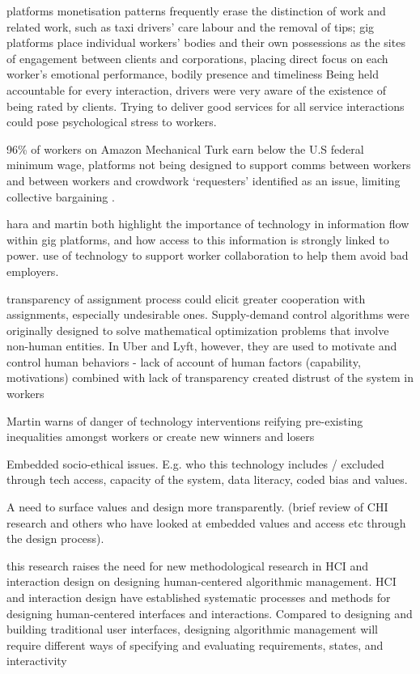 platforms monetisation patterns frequently erase the distinction of work and related work, such as taxi drivers' care labour and the removal of tips; gig platforms place individual workers' bodies and their own possessions as  the sites of engagement between clients and corporations, placing direct focus on each worker's emotional performance, bodily presence and timeliness  \cite{raval2016} Being held accountable for every interaction, drivers were very aware of the existence of being rated by clients. Trying to deliver good services for all service interactions could pose psychological stress to workers.\cite{lee2015}

96\% of workers on Amazon Mechanical Turk earn below the U.S federal minimum wage, platforms not being designed to support comms between workers and between workers and crowdwork `requesters' identified as an issue, limiting collective bargaining \cite{Hara2018}. 

hara and martin both highlight the importance of technology in information flow within gig platforms, and how access to this information is strongly linked to power. use of technology to support worker collaboration to help them avoid bad employers.

transparency of assignment process could elicit greater cooperation with assignments, especially undesirable ones. Supply-demand control algorithms were originally designed to solve mathematical optimization problems that involve non-human entities. In Uber and Lyft, however, they are used to motivate and control human behaviors - lack of account of human factors (capability, motivations) combined with lack of transparency created distrust of the system in workers  \cite{lee2015}

Martin warns of danger of technology interventions reifying pre-existing inequalities amongst workers or create new winners and losers \cite{martin2016} 



Embedded socio-ethical issues. E.g. who this technology includes / excluded through tech access, capacity of the system, data literacy, coded bias and values. 

A need to surface values and design more transparently. (brief review of CHI research and others who have looked at embedded values and access etc through the design process).  


this research raises the need for new methodological research in HCI and interaction design on designing human-centered algorithmic management. HCI and interaction design have established systematic processes and methods for designing human-centered interfaces and interactions. Compared to designing and building traditional user interfaces, designing algorithmic management will require different ways of specifying and evaluating requirements, states, and
interactivity



